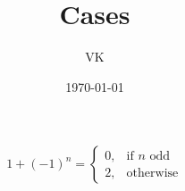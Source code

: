 \documentclass{article}
\title{Cases}
\author{VK}
\date{\today}
\begin{document}
\maketitle

$$
1+(-1)^n=\begin{cases}
			0, & \text{if $n$ odd}\\
            2, & \text{otherwise}
		 \end{cases}
$$
\end{document}
